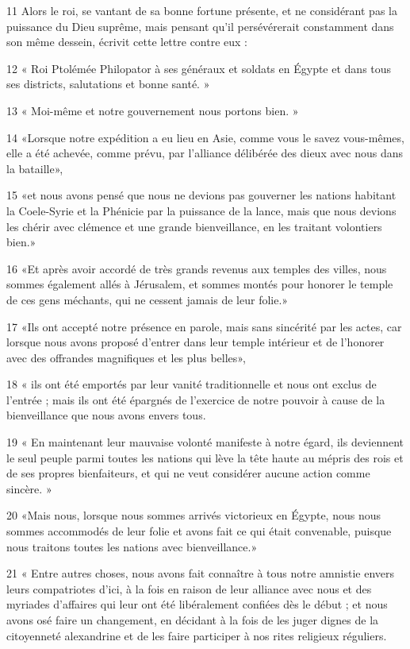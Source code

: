\par 11 Alors le roi, se vantant de sa bonne fortune présente, et ne considérant pas la puissance du Dieu suprême, mais pensant qu'il persévérerait constamment dans son même dessein, écrivit cette lettre contre eux :
\par 12 « Roi Ptolémée Philopator à ses généraux et soldats en Égypte et dans tous ses districts, salutations et bonne santé. »
\par 13 « Moi-même et notre gouvernement nous portons bien. »
\par 14 «Lorsque notre expédition a eu lieu en Asie, comme vous le savez vous-mêmes, elle a été achevée, comme prévu, par l'alliance délibérée des dieux avec nous dans la bataille»,
\par 15 «et nous avons pensé que nous ne devions pas gouverner les nations habitant la Coele-Syrie et la Phénicie par la puissance de la lance, mais que nous devions les chérir avec clémence et une grande bienveillance, en les traitant volontiers bien.»
\par 16 «Et après avoir accordé de très grands revenus aux temples des villes, nous sommes également allés à Jérusalem, et sommes montés pour honorer le temple de ces gens méchants, qui ne cessent jamais de leur folie.»
\par 17 «Ils ont accepté notre présence en parole, mais sans sincérité par les actes, car lorsque nous avons proposé d'entrer dans leur temple intérieur et de l'honorer avec des offrandes magnifiques et les plus belles»,
\par 18 « ils ont été emportés par leur vanité traditionnelle et nous ont exclus de l'entrée ; mais ils ont été épargnés de l’exercice de notre pouvoir à cause de la bienveillance que nous avons envers tous.
\par 19 « En maintenant leur mauvaise volonté manifeste à notre égard, ils deviennent le seul peuple parmi toutes les nations qui lève la tête haute au mépris des rois et de ses propres bienfaiteurs, et qui ne veut considérer aucune action comme sincère. »
\par 20 «Mais nous, lorsque nous sommes arrivés victorieux en Égypte, nous nous sommes accommodés de leur folie et avons fait ce qui était convenable, puisque nous traitons toutes les nations avec bienveillance.»
\par 21 « Entre autres choses, nous avons fait connaître à tous notre amnistie envers leurs compatriotes d'ici, à la fois en raison de leur alliance avec nous et des myriades d'affaires qui leur ont été libéralement confiées dès le début ; et nous avons osé faire un changement, en décidant à la fois de les juger dignes de la citoyenneté alexandrine et de les faire participer à nos rites religieux réguliers.
